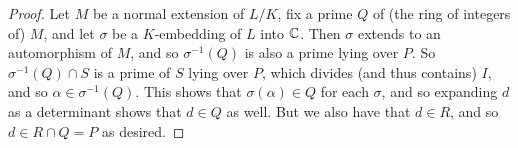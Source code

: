 \begin{proof}
	Let $M$ be a normal extension of $L/K$, fix a prime $Q$ of (the ring of integers of) $M$, and let $\sigma$ be a $K$-embedding of $L$ into $\mathbb{C}$. Then $\sigma$ extends to an automorphism of $M$, and so $\sigma^{-1}(Q)$ is also a prime lying over $P$. So $\sigma^{-1}(Q) \cap S$ is a prime of $S$ lying over $P$, which divides (and thus contains) $I$, and so $\alpha \in \sigma^{-1}(Q)$. This shows that $\sigma(\alpha) \in Q$ for each $\sigma$, and so expanding $d$ as a determinant shows that $d \in Q$ as well. But we also have that $d \in R$, and so $d \in R \cap Q = P$ as desired.
\end{proof}
